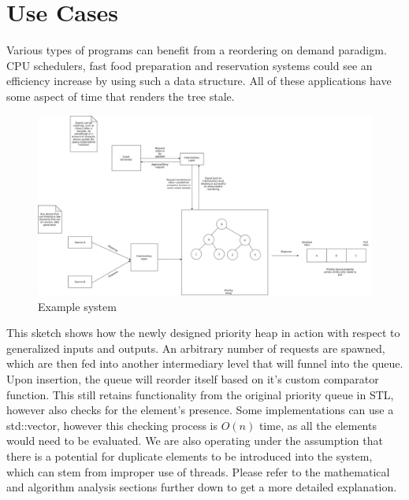 \documentclass{article}
\begin{document}
\newpage

\section{Use Cases}

\begin{flushleft}

Various types of programs can benefit from a reordering on demand paradigm.
CPU schedulers, fast food preparation and reservation systems could see an efficiency increase by using such a data structure.
All of these applications have some aspect of time that renders the tree stale.

\begin{figure}[!h]
\centering
\includegraphics[width=15cm]{UseCaseSketch}
\caption{Example system}
\end{figure}

This sketch shows how the newly designed priority heap in action with respect to generalized inputs and outputs.
An arbitrary number of requests are spawned, which are then fed into another intermediary level that will funnel into the queue.
Upon insertion, the queue will reorder itself based on it's custom comparator function.
This still retains functionality from the original priority queue in STL, however also checks for the element's presence.
Some implementations can use a std::vector, however this checking process is $O(n)$ time, as all the elements would need to be evaluated.
We are also operating under the assumption that there is a potential for duplicate elements to be introduced into the system, which can stem from improper use of threads.
Please refer to the mathematical and algorithm analysis sections further down to get a more detailed explanation.

\end{flushleft}
\end{document}
